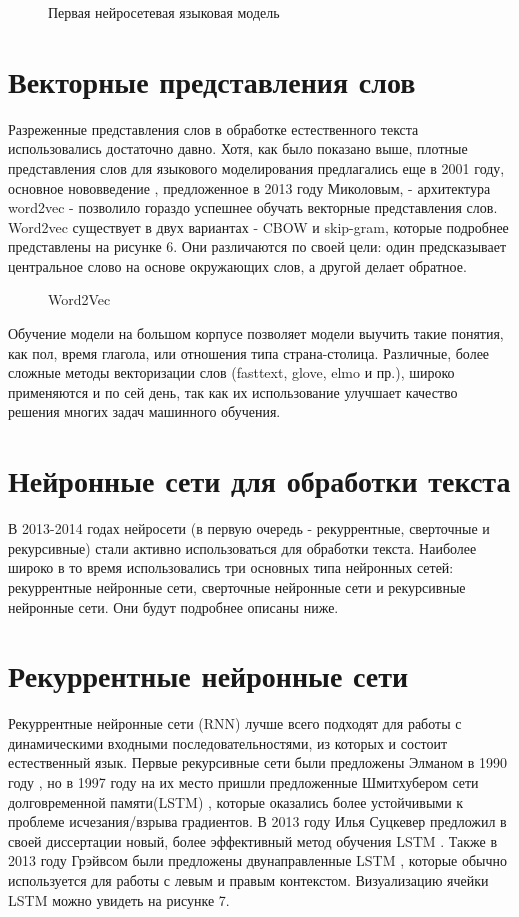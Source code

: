 \begin{figure}[ht]
  \caption{Первая нейросетевая языковая модель}\label{fig:Neuro1-Feedforward}
\end{figure}


\section{Векторные представления слов}
Разреженные представления слов в обработке естественного текста использовались достаточно давно. Хотя, как было показано выше, плотные представления слов для языкового моделирования предлагались еще в 2001 году, основное нововведение \cite{Mikolov_Chen_Corrado_Dean_2013}, предложенное в 2013 году Миколовым, - архитектура word2vec - позволило гораздо успешнее обучать векторные представления слов. Word2vec существует в двух вариантах - CBOW и skip-gram, которые подробнее представлены на рисунке 6. Они различаются по своей цели: один предсказывает центральное слово на основе окружающих слов, а другой делает обратное.


\begin{figure}[ht]
  \caption{Word2Vec}\label{fig:Neuro2-Word2Vec}
\end{figure}

Обучение модели на большом корпусе позволяет модели выучить такие понятия, как пол, время глагола, или отношения типа страна-столица. Различные, более сложные методы векторизации слов (fasttext, glove, elmo и пр.), широко применяются и по сей день, так как их использование улучшает качество решения многих задач машинного обучения.


\section{Нейронные сети для обработки текста}
В 2013-2014 годах нейросети (в первую очередь - рекуррентные, сверточные и рекурсивные) стали активно использоваться для обработки текста.  Наиболее широко в то время использовались три основных типа нейронных сетей: рекуррентные нейронные сети, сверточные нейронные сети и рекурсивные нейронные сети. Они будут подробнее описаны ниже.

\section{Рекуррентные нейронные сети}
Рекуррентные нейронные сети (RNN) лучше всего подходят для работы с динамическими входными последовательностями, из которых и состоит естественный язык.  Первые рекурсивные сети были предложены Элманом в 1990 году \cite{Elman_1990}, но в 1997 году на их место пришли предложенные Шмитхубером сети долговременной памяти(LSTM) \cite{Hochreiter_Schmidhuber_1997}, которые оказались более устойчивыми к проблеме исчезания/взрыва градиентов. В 2013 году Илья Суцкевер предложил в своей диссертации новый, более эффективный метод обучения LSTM \cite{Suskever_2013}. Также в 2013 году Грэйвсом были предложены двунаправленные LSTM \cite{Graves_Jaitly_Mohamed_2013}, которые обычно используется для работы с левым и правым контекстом. Визуализацию ячейки LSTM можно увидеть на рисунке 7.  


